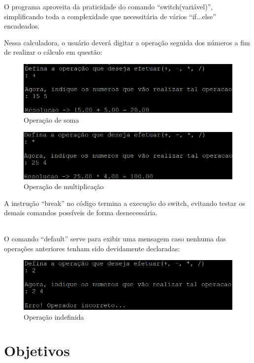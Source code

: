 \documentclass[a4paper,12pt]{article}  %
\begin{document}
   O programa aproveita da praticidade do comando “switch(variável)”, simplificando toda a complexidade que necessitária de vários “if...else” encadeados. \par
 Nessa calculadora, o usuário deverá digitar a operação seguida dos números a fim de realizar o cálculo em questão: 
 
 \begin{figure}[H]
 \centering
 \includegraphics[width=.80\linewidth]{imagens/ex5.png}
 \caption{Operação de soma}
 \end{figure}

 \begin{figure}[H]
 \centering
 \includegraphics[width=.80\linewidth]{imagens/ex6.png}
 \caption{Operação de multiplicação}
\end{figure}

     A instrução “break” no código termina a execução do switch, evitando testar os demais comandos possíveis de forma desnecessária. \par
   \\
     O comando “default” serve para exibir uma mensagem caso nenhuma das operações anteriores tenham sido devidamente declaradas:


 \begin{figure}[H]
 \centering
 \includegraphics[width=.80\linewidth]{imagens/ex7.png}
 \caption{Operação indefinida}
\end{figure}


\section{Objetivos}
\end{document}
